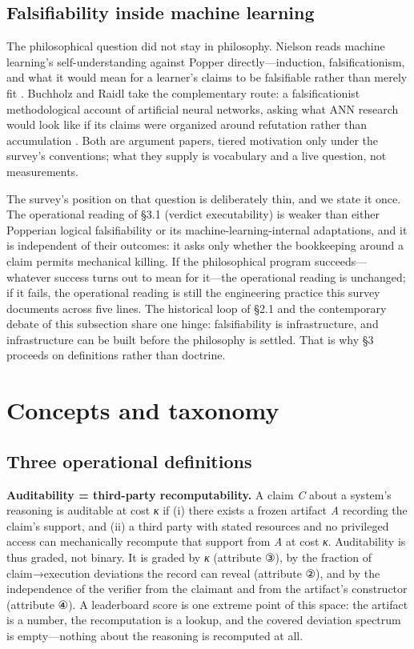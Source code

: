 \documentclass[11pt,a4paper]{article}
\begin{document}
\subsection{Falsifiability inside machine learning}

The philosophical question did not stay in philosophy. Nielson reads machine learning's self-understanding against Popper directly—induction, falsificationism, and what it would mean for a learner's claims to be falsifiable rather than merely fit \cite{key27}. Buchholz and Raidl take the complementary route: a falsificationist methodological account of artificial neural networks, asking what ANN research would look like if its claims were organized around refutation rather than accumulation \cite{key28}. Both are argument papers, tiered motivation only under the survey's conventions; what they supply is vocabulary and a live question, not measurements.

The survey's position on that question is deliberately thin, and we state it once. The operational reading of §3.1 (verdict executability) is weaker than either Popperian logical falsifiability or its machine-learning-internal adaptations, and it is independent of their outcomes: it asks only whether the bookkeeping around a claim permits mechanical killing. If the philosophical program succeeds—whatever success turns out to mean for it—the operational reading is unchanged; if it fails, the operational reading is still the engineering practice this survey documents across five lines. The historical loop of §2.1 and the contemporary debate of this subsection share one hinge: falsifiability is infrastructure, and infrastructure can be built before the philosophy is settled. That is why §3 proceeds on definitions rather than doctrine.

\section{Concepts and taxonomy}

\subsection{Three operational definitions}

\textbf{Auditability = third-party recomputability.} A claim \textit{C} about a system's reasoning is auditable at cost \textit{κ} if (i) there exists a frozen artifact \textit{A} recording the claim's support, and (ii) a third party with stated resources and no privileged access can mechanically recompute that support from \textit{A} at cost \textit{κ}. Auditability is thus graded, not binary. It is graded by \textit{κ} (attribute ③), by the fraction of claim→execution deviations the record can reveal (attribute ②), and by the independence of the verifier from the claimant and from the artifact's constructor (attribute ④). A leaderboard score is one extreme point of this space: the artifact is a number, the recomputation is a lookup, and the covered deviation spectrum is empty—nothing about the reasoning is recomputed at all.
\end{document}
